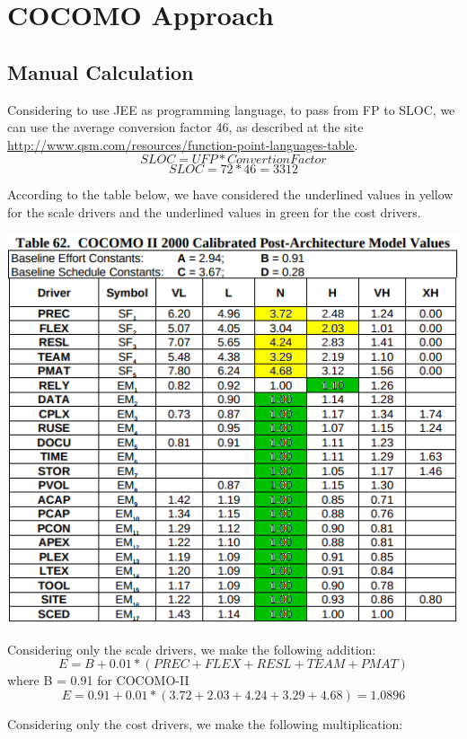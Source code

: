 \section{COCOMO Approach}
\subsection{Manual Calculation}
	Considering to use JEE as programming language, to pass from FP to SLOC, we can use the average conversion factor 46, as described at the site \newline \url{http://www.qsm.com/resources/function-point-languages-table}. 
	$$SLOC=UFP*ConvertionFactor$$
	$$SLOC=72*46=3312$$
	
	According to the table below, we have considered the underlined values in yellow for the scale drivers and the underlined values in green for the cost drivers.
	
	\begin{center}
			\includegraphics[width=1\textwidth]{./images/drivers.png}
	\end{center}
	\newpage
	\noindent Considering only the scale drivers, we make the following addition:
	$$E=B + 0.01*(PREC+FLEX+RESL+TEAM+PMAT)$$ where B = 0.91 for COCOMO-II
	$$E=0.91+0.01*(3.72+2.03+4.24+3.29+4.68)=1.0896$$
	
	
	\noindent Considering only the cost drivers, we make the following multiplication:

